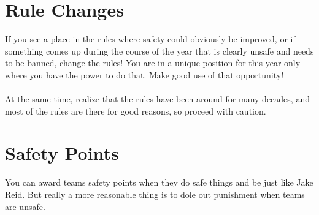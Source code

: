 \section{Rule Changes}
If you see a place in the rules where safety could obviously be improved,
or if something comes up during the course of the year that is clearly
unsafe and needs to be banned, change the rules! You are in a unique
position for this year only where you have the power to do that. Make good
use of that opportunity!
\\\\
At the same time, realize that the rules have been around for many decades,
and most of the rules are there for good reasons, so proceed with caution.

\section{Safety Points}
\label{sec:Safety Points}
You can award teams safety points when they do safe things and be just like
Jake Reid. But really a more reasonable thing is to dole out punishment when
teams are unsafe.
